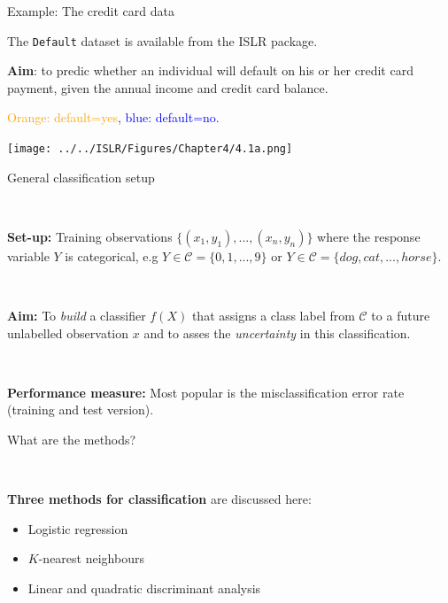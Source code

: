 \documentclass[10pt,ignorenonframetext,]{beamer}
\begin{document}
\begin{frame}[fragile]

\begin{block}{Example: The credit card data}

The \texttt{Default} dataset is available from the ISLR package.

\vspace{2mm}
{\bf Aim}: to predic whether an individual will default on his or her
credit card payment, given the annual income and credit card balance.

\textcolor{orange}{Orange: default=yes},
\textcolor{blue}{blue: default=no}.

\vspace{0mm} \centering
\texttt{[image: ../../ISLR/Figures/Chapter4/4.1a.png]}

\end{block}

\end{frame}

\begin{frame}

\begin{block}{General classification setup}

\(~\)

\textbf{Set-up:} Training observations
\(\{(x_1, y_1), ..., (x_n, y_n)\}\) where the response variable \(Y\) is
categorical, e.g \(Y \in \mathcal{C} = \{0, 1, ..., 9\}\) or
\(Y \in \mathcal{C} = \{dog, cat,... ,horse\}\).

\(~\)

\textbf{Aim: } To \emph{build} a classifier \(f(X)\) that assigns a
class label from \(\mathcal{C}\) to a future unlabelled observation
\(x\) and to asses the \emph{uncertainty} in this classification.

\(~\)

\textbf{Performance measure:} Most popular is the misclassification
error rate (training and test version).

\end{block}

\end{frame}

\begin{frame}

\begin{block}{What are the methods?}

\(~\)

\textbf{Three methods for classification} are discussed here:

\begin{itemize}
\item
  Logistic regression
\item
  \(K\)-nearest neighbours
\item
  Linear and quadratic discriminant analysis
\end{itemize}

\end{block}

\end{frame}
\end{document}
